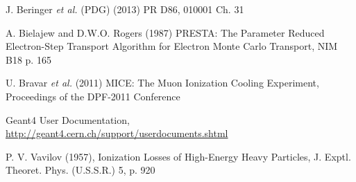 \documentclass{jacow}
\begin{document}
\begin{thebibliography}{9}
J. Beringer \emph{et al.} (PDG) (2013) PR D86, 010001 Ch. 31

A. Bielajew and D.W.O. Rogers (1987) PRESTA: The Parameter Reduced Electron-Step Transport Algorithm for Electron Monte Carlo Transport, NIM B18 p. 165

U. Bravar \emph{et al.} (2011) MICE: The Muon Ionization Cooling Experiment, Proceedings of the DPF-2011 Conference

Geant4 User Documentation, \url{http://geant4.cern.ch/support/userdocuments.shtml}

P. V. Vavilov (1957), Ionization Losses of High-Energy Heavy Particles, J. Exptl. Theoret. Phys. (U.S.S.R.) 5, p. 920

\end{thebibliography}
\ \\
\end{document}
